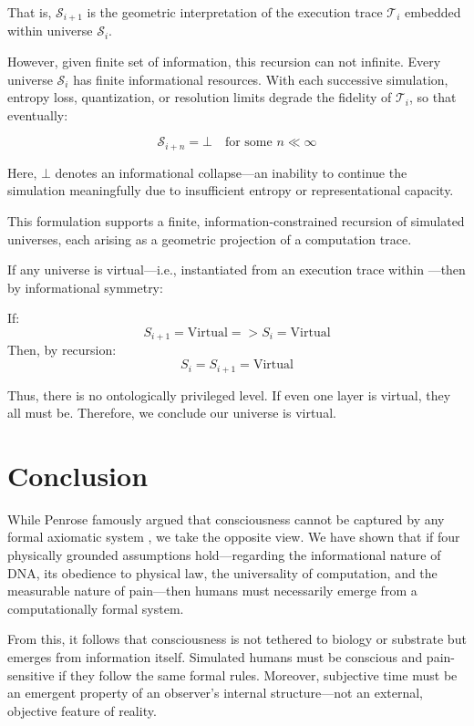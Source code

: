 \documentclass[11pt]{article}
\begin{document}
That is, \( \mathcal{S}_{i+1} \) is the geometric interpretation of the execution trace \( \mathcal{T}_i \) embedded within universe \( \mathcal{S}_i \).

However, given finite set of information, this recursion can not infinite. Every universe \( \mathcal{S}_i \) has finite informational resources. With each successive simulation, entropy loss, quantization, or resolution limits degrade the fidelity of \( \mathcal{T}_i \), so that eventually:

\[
  \mathcal{S}_{i+n} = \bot \quad \text{for some } n \ll \infty
\]

Here, \( \bot \) denotes an informational collapse—an inability to continue the simulation meaningfully due to insufficient entropy or representational capacity.

This formulation supports a finite, information-constrained recursion of simulated universes, each arising as a geometric projection of a computation trace.

If any universe  is virtual—i.e., instantiated from an execution trace within —then by informational symmetry:

If:
\[
  S_{i+1} = \text{Virtual} => S_{i} = \text{Virtual}
\]
Then, by recursion:
\[
  S_i = S_{i+1} = \text{Virtual}
\]

Thus, there is no ontologically privileged level. If even one layer is virtual, they all must be. Therefore, we conclude our universe is virtual.



\section{Conclusion}

While Penrose \cite{penrose1989emperor} famously argued that consciousness cannot be captured by any formal axiomatic system , we take the opposite view. We have shown that if four physically grounded assumptions hold—regarding the informational nature of DNA, its obedience to physical law, the universality of computation, and the measurable nature of pain—then humans must necessarily emerge from a computationally formal system.

From this, it follows that consciousness is not tethered to biology or substrate but emerges from information itself. Simulated humans must be conscious and pain-sensitive if they follow the same formal rules. Moreover, subjective time must be an emergent property of an observer’s internal structure—not an external, objective feature of reality.
\end{document}
